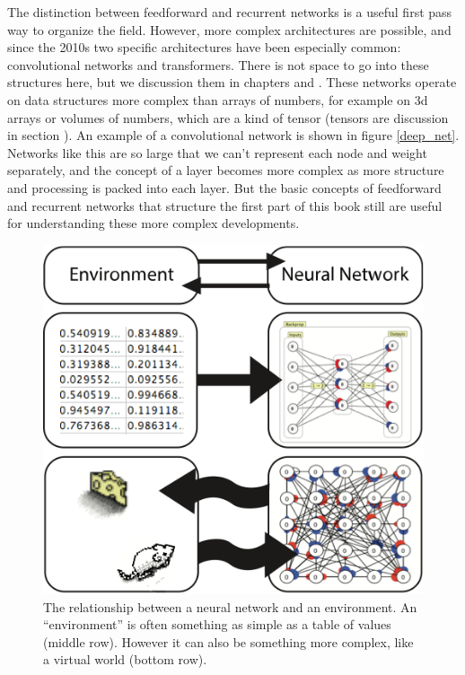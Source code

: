 The distinction between feedforward and recurrent networks is a useful first pass way to organize the field. However, more complex architectures are possible, and since the 2010s two specific architectures have been especially common: convolutional networks and transformers.  There is not space to go into these structures here, but we discussion them in chapters  and . These networks operate on data structures more complex than arrays of numbers, for example on 3d arrays or volumes of numbers, which are a kind of tensor (tensors are discussion in section ). An example of a convolutional network is shown in figure \ref{deep_net}. Networks like this are so large that we can't represent each node and weight separately, and the concept of a layer becomes more complex as more structure and processing is packed into each layer. But the basic concepts of feedforward and recurrent networks that structure the first part of this book still are useful for understanding these more complex developments. 

\begin{figure}[h]
\centering
\includegraphics[scale=.7]{./images/nn_environment.png}
\caption[Pamela Payne.]{The relationship between a neural network and an environment. An ``environment'' is often something as simple as a table of values (middle row). However it can also be something more complex, like a virtual world (bottom row).}
\label{nn_environment}
\end{figure}

